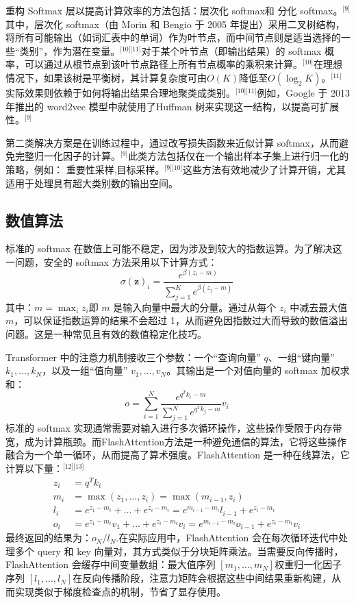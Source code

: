 重构 Softmax 层以提高计算效率的方法包括：层次化 softmax和 分化 softmax。\(^\text{[9]}\)其中，层次化 softmax（由 Morin 和 Bengio 于 2005 年提出）采用二叉树结构，将所有可能输出（如词汇表中的单词）作为叶节点，而中间节点则是适当选择的一些“类别”，作为潜在变量。\(^\text{[10][11]}\)对于某个叶节点（即输出结果）的 softmax 概率，可以通过从根节点到该叶节点路径上所有节点概率的乘积来计算。\(^\text{[10]}\)在理想情况下，如果该树是平衡树，其计算复杂度可由$O(K)$降低至$O(\log_2 K)$。\(^\text{[11]}\)实际效果则依赖于如何将输出结果合理地聚类成类别。\(^\text{[10][11]}\)例如，Google 于 2013 年推出的 word2vec 模型中就使用了Huffman 树来实现这一结构，以提高可扩展性。\(^\text{[9]}\)

第二类解决方案是在训练过程中，通过改写损失函数来近似计算 softmax，从而避免完整归一化因子的计算。\(^\text{[9]}\)此类方法包括仅在一个输出样本子集上进行归一化的策略，例如：  重要性采样,目标采样。\(^\text{[9][10]}\)这些方法有效地减少了计算开销，尤其适用于处理具有超大类别数的输出空间。
\subsection{数值算法}
标准的 softmax 在数值上可能不稳定，因为涉及到较大的指数运算。为了解决这一问题，安全的 softmax 方法采用以下计算方式：
$$
\sigma(\mathbf{z})_i = \frac{e^{\beta (z_i - m)}}{\sum_{j=1}^{K} e^{\beta (z_j - m)}}~
$$
其中：$m = \max_i z_i$即 $m$ 是输入向量中最大的分量。通过从每个 $z_i$ 中减去最大值 $m$，可以保证指数运算的结果不会超过 1，从而避免因指数过大而导致的数值溢出问题。这是一种常见且有效的数值稳定化技巧。

Transformer 中的注意力机制接收三个参数：一个“查询向量” $q$、一组“键向量” $k_1, \dots, k_N$，以及一组“值向量” $v_1, \dots, v_N$。其输出是一个对值向量的 softmax 加权求和：
$$
o = \sum_{i=1}^{N} \frac{e^{q^{T}k_i - m}}{\sum_{j=1}^{N} e^{q^{T}k_j - m}} v_i~
$$
标准的 softmax 实现通常需要对输入进行多次循环操作，这些操作受限于内存带宽，成为计算瓶颈。而FlashAttention方法是一种避免通信的算法，它将这些操作融合为一个单一循环，从而提高了算术强度。FlashAttention 是一种在线算法，它计算以下量：\(^\text{[12][13]}\)
$$
\begin{aligned}
z_i &= q^T k_i \\
m_i &= \max(z_1, \dots, z_i) = \max(m_{i-1}, z_i) \\
l_i &= e^{z_1 - m_i} + \dots + e^{z_i - m_i} = e^{m_{i-1} - m_i} l_{i-1} + e^{z_i - m_i} \\
o_i &= e^{z_1 - m_i} v_1 + \dots + e^{z_i - m_i} v_i = e^{m_{i-1} - m_i} o_{i-1} + e^{z_i - m_i} v_i
\end{aligned}~
$$
最终返回的结果为：$o_N/l_N$.在实际应用中，FlashAttention 会在每次循环迭代中处理多个 query 和 key 向量对，其方式类似于分块矩阵乘法。当需要反向传播时，FlashAttention 会缓存中间变量数组：最大值序列 $[m_1, \dots, m_N]$权重归一化因子序列 $[l_1, \dots, l_N]$在反向传播阶段，注意力矩阵会根据这些中间结果重新构建，从而实现类似于梯度检查点的机制，节省了显存使用。
